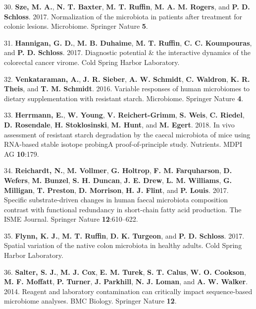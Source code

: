 \documentclass[12pt,]{article}
\begin{document}
\hypertarget{ref-Sze2017}{}
30. \textbf{Sze, M. A.}, \textbf{N. T. Baxter}, \textbf{M. T. Ruffin},
\textbf{M. A. M. Rogers}, and \textbf{P. D. Schloss}. 2017.
Normalization of the microbiota in patients after treatment for colonic
lesions. Microbiome. Springer Nature \textbf{5}.

\hypertarget{ref-Hannigan2017}{}
31. \textbf{Hannigan, G. D.}, \textbf{M. B. Duhaime}, \textbf{M. T.
Ruffin}, \textbf{C. C. Koumpouras}, and \textbf{P. D. Schloss}. 2017.
Diagnostic potential \& the interactive dynamics of the colorectal
cancer virome. Cold Spring Harbor Laboratory.

\hypertarget{ref-Venkataraman2016}{}
32. \textbf{Venkataraman, A.}, \textbf{J. R. Sieber}, \textbf{A. W.
Schmidt}, \textbf{C. Waldron}, \textbf{K. R. Theis}, and \textbf{T. M.
Schmidt}. 2016. Variable responses of human microbiomes to dietary
supplementation with resistant starch. Microbiome. Springer Nature
\textbf{4}.

\hypertarget{ref-Herrmann2018}{}
33. \textbf{Herrmann, E.}, \textbf{W. Young}, \textbf{V.
Reichert-Grimm}, \textbf{S. Weis}, \textbf{C. Riedel}, \textbf{D.
Rosendale}, \textbf{H. Stoklosinski}, \textbf{M. Hunt}, and \textbf{M.
Egert}. 2018. In vivo assessment of resistant starch degradation by the
caecal microbiota of mice using RNA-based stable isotope probingA
proof-of-principle study. Nutrients. MDPI AG \textbf{10}:179.

\hypertarget{ref-Reichardt2017}{}
34. \textbf{Reichardt, N.}, \textbf{M. Vollmer}, \textbf{G. Holtrop},
\textbf{F. M. Farquharson}, \textbf{D. Wefers}, \textbf{M. Bunzel},
\textbf{S. H. Duncan}, \textbf{J. E. Drew}, \textbf{L. M. Williams},
\textbf{G. Milligan}, \textbf{T. Preston}, \textbf{D. Morrison},
\textbf{H. J. Flint}, and \textbf{P. Louis}. 2017. Specific
substrate-driven changes in human faecal microbiota composition contrast
with functional redundancy in short-chain fatty acid production. The
ISME Journal. Springer Nature \textbf{12}:610--622.

\hypertarget{ref-Flynn_preprint_2017}{}
35. \textbf{Flynn, K. J.}, \textbf{M. T. Ruffin}, \textbf{D. K.
Turgeon}, and \textbf{P. D. Schloss}. 2017. Spatial variation of the
native colon microbiota in healthy adults. Cold Spring Harbor
Laboratory.

\hypertarget{ref-Salter_contamination_2014}{}
36. \textbf{Salter, S. J.}, \textbf{M. J. Cox}, \textbf{E. M. Turek},
\textbf{S. T. Calus}, \textbf{W. O. Cookson}, \textbf{M. F. Moffatt},
\textbf{P. Turner}, \textbf{J. Parkhill}, \textbf{N. J. Loman}, and
\textbf{A. W. Walker}. 2014. Reagent and laboratory contamination can
critically impact sequence-based microbiome analyses. BMC Biology.
Springer Nature \textbf{12}.
\end{document}
